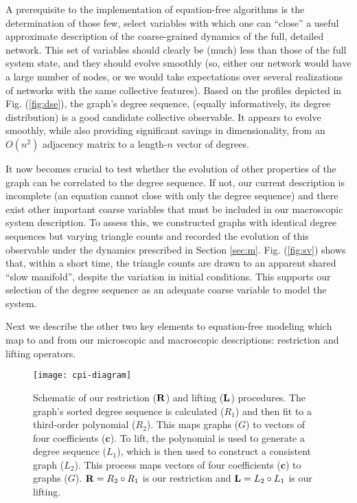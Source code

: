   A prerequisite to the implementation of equation-free algorithms is
  the determination of those few, select variables with which one can
  ``close'' a useful approximate description of the coarse-grained
  dynamics of the full, detailed network.
  This set of variables should clearly be (much) less than those of
  the full system state, and they should evolve smoothly (so, either
  our network would have a large number of nodes, or we would take
  expectations over several realizations of networks with the same
  collective features).
  Based on the profiles depicted in Fig. (\ref{fig:dse}), the graph's
  degree sequence, (equally informatively, its degree distribution) is
  a good candidate collective observable.
  It appears to evolve smoothly, while also providing significant
  savings in dimensionality, from an $O(n^2)$ adjacency matrix to a
  length-$n$ vector of degrees. \par

  It now becomes crucial to test whether the evolution of other
  properties of the graph can be correlated to the degree sequence.
  If not, our current description is incomplete (an equation cannot
  close with only the degree sequence) and there exist other important
  coarse variables that must be included in our macroscopic system
  description.
  To assess this, we constructed graphs with identical degree
  sequences but varying triangle counts and recorded the evolution of
  this observable under the dynamics prescribed in Section
  \ref{sec:m}. Fig. (\ref{fig:sv}) shows that, within a short time,
  the triangle counts are drawn to an apparent shared ``slow
  manifold'', despite the variation in initial conditions.
  This supports our selection of the degree sequence as an adequate
  coarse variable to model the system. \par

  Next we describe the other two key elements to equation-free
  modeling which map to and from our microscopic and macroscopic
  descriptions: restriction and lifting operators.

  \begin{figure}
    \centering
    \texttt{[image: cpi-diagram]}
    \caption[Schematic of multigraph's lifting and restricting
    procedures]{Schematic of our restriction ($\mathbf{R}$) and
      lifting ($\mathbf{L}$) procedures. The graph's sorted degree
      sequence is calculated ($R_1$) and then fit to a third-order
      polynomial ($R_2$). This maps graphs ($G$) to vectors of four
      coefficients ($\mathbf{c}$). To lift, the polynomial is used to
      generate a degree sequence ($L_1$), which is then used to
      construct a consistent graph ($L_2$). This process maps vectors
      of four coefficients ($\mathbf{c}$) to graphs ($G$).
      $\mathbf{R} = R_2 \circ R_1 $ is our restriction and
      $\mathbf{L} = L_2 \circ L_1$ is our
      lifting. \label{fig:cpi-diagram}}
  \end{figure}


